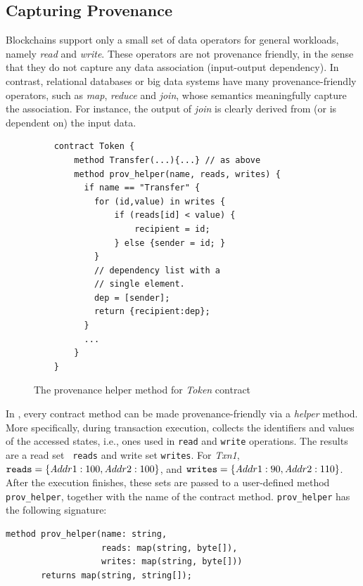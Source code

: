 \subsection{Capturing Provenance}
Blockchains support only a small set of data operators for general workloads, namely \textit{read} and \textit{write}. These operators are not provenance friendly, in the sense that they do not capture any data
association (input-output dependency). In contrast, relational databases or big data systems have many
provenance-friendly operators, such as \textit{map}, \textit{reduce} and \textit{join}, whose semantics meaningfully
capture the association. For instance, the output of \textit{join} is clearly derived from (or is dependent on)
the input data.  

\begin{figure}
    \footnotesize
    \centering
    \begin{verbatim}
    contract Token {
        method Transfer(...){...} // as above
        method prov_helper(name, reads, writes) {
          if name == "Transfer" {
            for (id,value) in writes {
                if (reads[id] < value) {
                    recipient = id;
                } else {sender = id; }
            }
            // dependency list with a 
            // single element. 
            dep = [sender];  
            return {recipient:dep};
          } 
          ...
        }
    }
    \end{verbatim}
    \caption{The provenance helper method for \textit{Token} contract}
    \label{prov:code:helper_contract}
\end{figure}


In {\fs}, every contract method can be made provenance-friendly via a {\em helper} method.  
More specifically, during transaction execution, {\fs} collects the identifiers and values of the
accessed states, i.e., ones used in \texttt{read} and \texttt{write} operations. The results are a read set \texttt{ 
reads} and write set \texttt{writes}. For {\em Txn1}, ${\texttt{reads}} = \{{\textit Addr1}: 100, {\textit Addr2}:
100\}$, and ${\texttt{writes}} = \{{\textit Addr1}: 90, {\textit Addr2}: 110\}$. After the execution finishes,
these sets are passed to a user-defined method \texttt{prov\_helper}, together with the name of the contract
method. \texttt{prov\_helper} has the following signature:
\begin{verbatim}
method prov_helper(name: string,
                   reads: map(string, byte[]), 
                   writes: map(string, byte[])) 
       returns map(string, string[]);
\end{verbatim}

